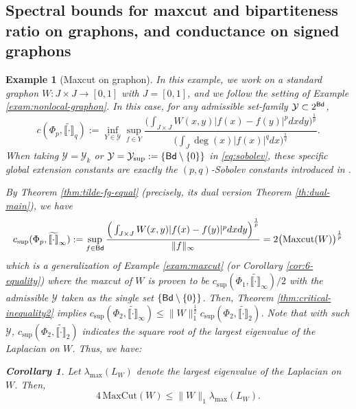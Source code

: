 \documentclass[12pt,a4paper]{article}
\newtheorem{corollary}[theorem]{Corollary}
\newtheorem{example}[theorem]{Example}
\begin{document}
\subsection{Spectral bounds for maxcut and bipartiteness ratio on graphons, and conductance on signed graphons}\label{subsec:spectral-bound}

\begin{example}[Maxcut on graphon]

In this example, we work on a standard graphon $W:J\times J\to [0,1]$ with $J=[0,1]$, and we follow the setting of Example \ref{exam:nonlocal-graphon}. In this case, for any admissible set-family $\mathcal{Y}\subset2^{\sf Bd}$, \begin{equation}\label{eq:sobolev}
c(\Phi_p,\widetilde{\llbracket \cdot\rrbracket}_q):=\inf\limits_{Y\in \mathcal{Y}}\sup\limits_{f\in Y} \frac{\Big(\int_{J\times J}W(x,y)|f(x)-f(y)|^pdxdy\Big)^{\frac1p} }{\big(\int_J \deg(x)|f(x)|^qdx\big)^{\frac1q}}  .  
\end{equation}
When taking $\mathcal{Y}=\mathcal{Y}_k$ or $\mathcal{Y}=\mathcal{Y}_{\sup}:=\{{\sf Bd}\setminus\{0\}\}$ in \eqref{eq:sobolev}, these specific global extension constants are exactly the $(p,q)$-Sobolev constants introduced in \cite{Zhang/graphon}. 

By Theorem \ref{thm:tilde-fg-equal} (precisely, its dual version Theorem \ref{th:dual-main}), we have 
\begin{equation}\label{eq:maxcut=p/infty}
c_{\sup}(\Phi_p,\widetilde{\llbracket \cdot\rrbracket}_\infty):=\sup\limits_{f\in {\sf Bd}} \frac{\Big(\int_{J\times J}W(x,y)|f(x)-f(y)|^pdxdy\Big)^{\frac1p} }{\|f\|_\infty}   = 2 \big(\mathrm{Maxcut}(W) \big)^{\frac1p}
\end{equation}
which is a generalization of Example \ref{exam:maxcut} (or Corollary \ref{cor:6-equality}) where the maxcut of $W$ is proven to be %
$c_{\sup}(\Phi_1,\widetilde{\llbracket \cdot\rrbracket}_\infty)/2$ with the admissible $\mathcal{Y}$ taken as the single set $\{{\sf Bd}\setminus\{0\}\}$. %
Then, Theorem \ref{thm:critical-inequality2} implies 
$c_{\sup}(\Phi_2,\widetilde{\llbracket \cdot\rrbracket}_\infty)\le \|W\|_1^{\frac12}c_{\sup}(\Phi_2,\widetilde{\llbracket \cdot\rrbracket}_2)$. %
Note that with such $\mathcal{Y}$, $c_{\sup}(\Phi_2,\widetilde{\llbracket \cdot\rrbracket}_2)$ indicates the square root of the largest eigenvalue of the  Laplacian on $W$. %
Thus, we have:
\begin{corollary}\label{cor:maxcut-Lapla}
Let $\lambda_{\max}(L_W)$ denote the largest eigenvalue of the  Laplacian on $W$. Then, 
$$4\, \mathrm{MaxCut}(W) \le \|W\|_1\lambda_{\max}(L_W).$$
\end{corollary}
\end{example}
\end{document}
